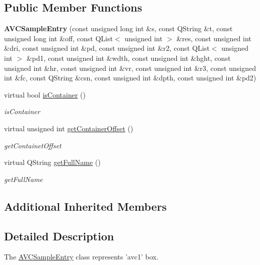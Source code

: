 \subsection*{Public Member Functions}
\begin{DoxyCompactItemize}
\item 
\hypertarget{class_a_v_c_sample_entry_ad32e3f0d543adacd2df65d8fb0daf4c7}{{\bfseries A\-V\-C\-Sample\-Entry} (const unsigned long int \&s, const Q\-String \&t, const unsigned long int \&off, const Q\-List$<$ unsigned int $>$ \&res, const unsigned int \&dri, const unsigned int \&pd, const unsigned int \&r2, const Q\-List$<$ unsigned int $>$ \&pd1, const unsigned int \&wdth, const unsigned int \&hght, const unsigned int \&hr, const unsigned int \&vr, const unsigned int \&r3, const unsigned int \&fc, const Q\-String \&csn, const unsigned int \&dpth, const unsigned int \&pd2)}\label{class_a_v_c_sample_entry_ad32e3f0d543adacd2df65d8fb0daf4c7}

\item 
virtual bool \hyperlink{class_a_v_c_sample_entry_ae0627e8954e878a70c9a67e337fd5d26}{is\-Container} ()
\begin{DoxyCompactList}\small\item\em is\-Container \end{DoxyCompactList}\item 
virtual unsigned int \hyperlink{class_a_v_c_sample_entry_ab65d3ccefc8bcf0a0157d66189ecf8d8}{get\-Container\-Offset} ()
\begin{DoxyCompactList}\small\item\em get\-Containet\-Offset \end{DoxyCompactList}\item 
virtual Q\-String \hyperlink{class_a_v_c_sample_entry_a672f849ea0bd16cb832d1592ff8ae827}{get\-Full\-Name} ()
\begin{DoxyCompactList}\small\item\em get\-Full\-Name \end{DoxyCompactList}\end{DoxyCompactItemize}
\subsection*{Additional Inherited Members}


\subsection{Detailed Description}
The \hyperlink{class_a_v_c_sample_entry}{A\-V\-C\-Sample\-Entry} class represents 'avc1' box. 

